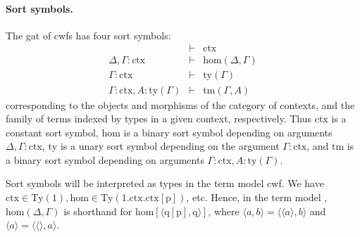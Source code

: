 \documentclass[11pt,a4paper]{article}
\theoremstyle{plain}
\theoremstyle{definition}
\newcommand{\Ty}{\mathrm{Ty}}
\def\sub{\mathrm{hom}}
\newcommand{\ctx}{\mathrm{ctx}}
\newcommand{\ty}{\mathrm{ty}}
\newcommand{\tm}{\mathrm{tm}}
\newcommand{\tuple}[1]{\langle #1 \rangle}
\def\p{\mathrm{p}}
\def\q{\mathrm{q}}
\begin{document}
\paragraph{Sort symbols.}
The gat of cwfs has four sort symbols:
\begin{eqnarray*}
&\vdash& \ctx\\
\Delta, \Gamma : \ctx&\vdash& \sub(\Delta,\Gamma)\\
\Gamma : \ctx&\vdash& \ty(\Gamma)\\
\Gamma : \ctx, A : \ty(\Gamma)&\vdash& \tm(\Gamma,A)
\end{eqnarray*}
corresponding to the objects and morphisms of the category of contexts, and the family of terms indexed by types in a given context, respectively. Thus $\ctx$ is a constant sort symbol, $\sub$ is a binary sort symbol depending on arguments $\Delta, \Gamma : \ctx$, $\ty$ is a unary sort symbol depending on the argument $\Gamma : \ctx$, and $\tm$ is a binary sort symbol depending on arguments $\Gamma : \ctx, A : \ty(\Gamma)$. 

Sort symbols will be interpreted as types in the term model cwf. We have $\ctx \in \Ty(1), \sub \in \Ty(1.\ctx.\ctx[\p])$, etc. Hence, in the term model \cite{bezem:hofmann}, $\sub(\Delta,\Gamma)$ is shorthand for $\sub[\tuple{\q[\p],\q}]$, where $\tuple{a,b} = \tuple{\tuple{a}, b}$ and $\tuple{a} = \tuple{\tuple{}, a}$.
\end{document}
